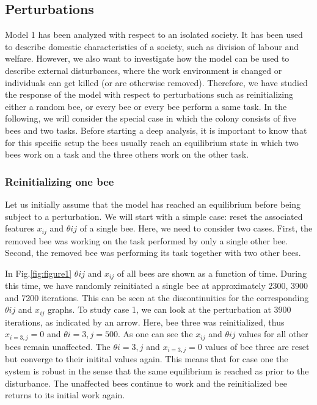 \subsection{Perturbations}
Model 1 has been analyzed with respect to an isolated society. It has been used to describe domestic characteristics of a society, such as division of labour and welfare. However, we also want to investigate how the model can be used to describe external disturbances, where the work environment is changed or individuals can get killed (or are otherwise removed). Therefore, we have studied the response of the model with respect to perturbations such as reinitializing either a random bee, or every bee or every bee perform a same task.
In the following, we will consider the special case in which the colony consists of five bees and two tasks. Before starting a deep analysis, it is important to know that for this specific setup the bees usually reach an equilibrium state in which two bees work on a task and the three others work on the other task. 

\subsubsection{Reinitializing one bee}
Let us initially assume that the model has reached an equilibrium before being subject to a perturbation. We will start with a simple case: reset the associated features $x_{ij}$ and $\theta{ij}$ of a single bee. Here, we need to consider two cases. First, the removed bee was working on the task performed by only a single other bee. Second, the removed bee was performing its task together with two other bees.

In Fig.\ref{fig:figure1} $\theta{ij}$ and $x_{ij}$ of all bees are shown as a function of time. During this time, we have randomly reinitiated a single bee at approximately 2300, 3900 and 7200 iterations. This can be seen at the discontinuities for the corresponding $\theta{ij}$ and $x_{ij}$ graphs. To study case 1, we can look at the perturbation at 3900 iterations, as indicated by an arrow. Here, bee three was reinitialized, thus $x_{i=3,j}=0$ and $\theta{i=3,j}=500$. As one can see the $x_{ij}$ and $\theta{ij}$ values for all other bees remain unaffected. The $\theta{i=3,j}$ and $x_{i=3,j}=0$ values of bee three are reset but converge to their initital values again. This means that for case one the system is robust in the sense that the same equilibrium is reached as prior to the disturbance. The unaffected bees continue to work and the reinitialized bee returns to its initial work again.

